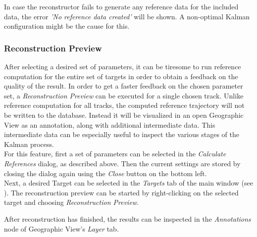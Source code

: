 In case the reconstructor fails to generate any reference data for the included data, the error 
\textit{'No reference data created'} will be shown. A non-optimal Kalman configuration might be the cause for this.

\subsubsection{Reconstruction Preview}
\label{sec:ui_proc_calc_references_preview}

After selecting a desired set of parameters, it can be tiresome to run reference computation for the entire 
set of targets in order to obtain a feedback on the quality of the result. In order to get a faster feedback on the 
chosen parameter set, a \textit{Reconstruction Preview} can be executed for a single chosen track. 
Unlike reference computation for all tracks, the computed reference trajectory will not be written to the database.
Instead it will be visualized in an open Geographic View as an annotation, along with additional intermediate data.
This intermediate data can be especially useful to inspect the various stages of the Kalman process. \\

For this feature, first a set of parameters can be selected in the \textit{Calculate References} dialog, as described above.
Then the current settings are stored by closing the dialog again using the \textit{Close} button on the bottom left. \\

Next, a desired Target can be selected in the \textit{Targets} tab of the main window (see ).
The reconstruction preview can be started by right-clicking on the selected target and choosing \textit{Reconstruction Preview}.


After reconstruction has finished, the results can be inspected in the \textit{Annotations} node of Geographic View's \textit{Layer} tab.


